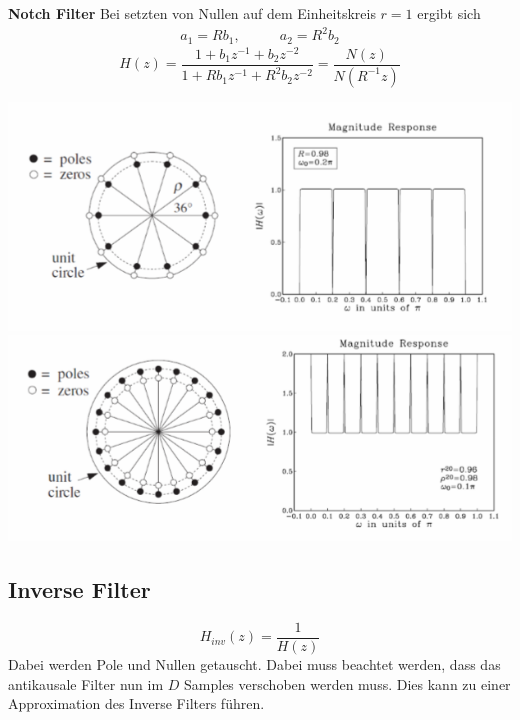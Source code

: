 \textbf{Notch Filter}
Bei setzten von Nullen auf dem Einheitskreis $r=1$ ergibt sich
\begin{align*}
	a_1 = Rb_1, &\qquad a_2 = R^2b_2
\end{align*}
\[
H(z) = \frac{1 + b_1z^{-1} + b_2z^{-2}}{1 + Rb_1z^{-1} + R^2b_2z^{-2}} = \frac{N(z)}{N(R^{-1}z)}
\]
\begin{center}
	\includegraphics[width=\columnwidth]{Images/notch}
	\includegraphics[width=\columnwidth]{Images/notch2}
\end{center}

\subsection{Inverse Filter}
\[
H_{inv}(z) = \frac{1}{H(z)}
\]
Dabei werden Pole und Nullen getauscht. Dabei muss beachtet werden, dass das antikausale Filter nun im $D$ Samples verschoben werden muss. Dies kann zu einer Approximation des Inverse Filters führen.

